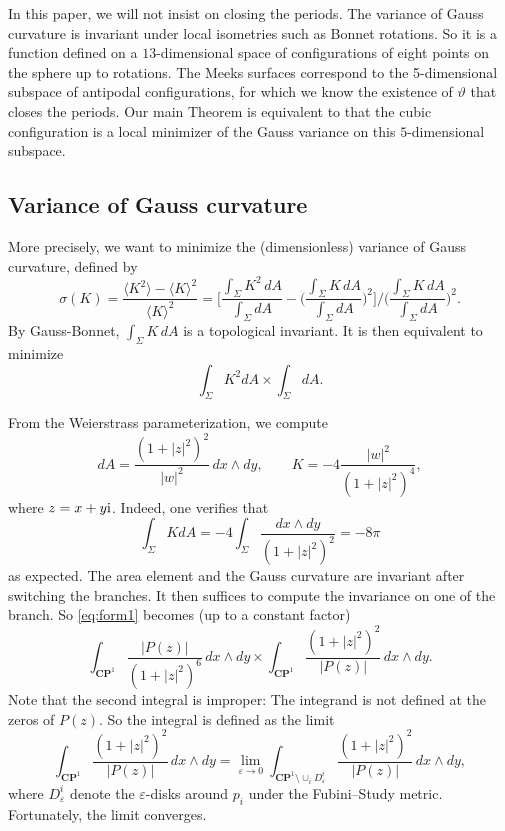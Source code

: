 \documentclass[a4paper]{amsart}
\newcommand{\CP}{\mathbf{CP}}
\newcommand{\ii}{{\rm i}}
\theoremstyle{plain} %
\theoremstyle{definition} %
\theoremstyle{remark}
\begin{document}
In this paper, we will not insist on closing the periods.  The variance of
Gauss curvature is invariant under local isometries such as Bonnet rotations.
So it is a function defined on a $13$-dimensional space of configurations of
eight points on the sphere up to rotations.  The Meeks surfaces correspond to
the 5-dimensional subspace of antipodal configurations, for which we know the
existence of $\vartheta$ that closes the periods.  Our main Theorem is
equivalent to that the cubic configuration is a local minimizer of the Gauss
variance on this $5$-dimensional subspace.

\subsection{Variance of Gauss curvature}

More precisely, we want to minimize the (dimensionless) variance of Gauss
curvature, defined by
\[
	\sigma(K)
	= \frac{\langle K^2 \rangle - \langle K \rangle^2}{\langle K \rangle^2}
	= \Bigg[\frac{\int_\Sigma K^2 \, dA}{\int_\Sigma dA} - \Bigg( \frac{\int_\Sigma K \, dA}{\int_\Sigma dA} \Bigg)^2\Bigg] / \Bigg( \frac{\int_\Sigma K \, dA}{\int_\Sigma dA} \Bigg)^2.
\]
By Gauss-Bonnet, $\int_\Sigma K \, dA$ is a topological invariant.  It is then
equivalent to minimize
\begin{equation}\label{eq:form1}
	\int_\Sigma K^2 dA \times \int_\Sigma dA.
\end{equation}

From the Weierstrass parameterization, we compute
\[
	dA = \frac{(1+|z|^2)^2}{|w|^2} \, dx \wedge dy, \qquad K = -4 \frac{|w|^2}{(1+|z|^2)^4},
\]
where $z = x + y \ii$.  Indeed, one verifies that
\[
	\int_\Sigma K dA = -4 \int_\Sigma \frac{dx \wedge dy}{(1+|z|^2)^2} = - 8 \pi
\]
as expected.  The area element and the Gauss curvature are invariant after
switching the branches.  It then suffices to compute the invariance on one of
the branch.  So \eqref{eq:form1} becomes (up to a constant factor)
\begin{equation}\label{eq:form2}
	\int_{\CP^1} \frac{|P(z)|}{(1+|z|^2)^6} \, dx \wedge dy \times
	\int_{\CP^1} \frac{(1+|z|^2)^2}{|P(z)|} \, dx \wedge dy.
\end{equation}
Note that the second integral is improper: The integrand is not defined at the
zeros of $P(z)$.  So the integral is defined as the limit
\[
	\int_{\CP^1} \frac{(1+|z|^2)^2}{|P(z)|} \, dx \wedge dy
	= \lim_{\varepsilon \to 0}
	\int_{\CP^1 \setminus \cup_i D^i_\varepsilon} \frac{(1+|z|^2)^2}{|P(z)|} \, dx \wedge dy,
\]
where $D^i_\varepsilon$ denote the $\varepsilon$-disks around $p_i$ under the
Fubini--Study metric.  Fortunately, the limit converges.
\end{document}

